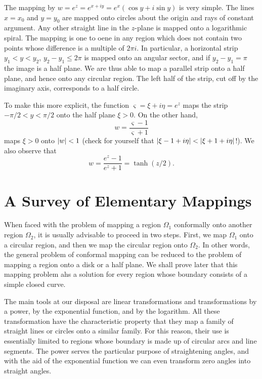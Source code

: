\begin{example}
    The mapping by $w=e^z=e^{x+iy}=e^x(\cos y+i \sin y)$ is very simple. The lines $x=x_0$ and $y=y_0$ are mapped onto circles about the origin and rays of constant argument. Any other straight line in the $z$-plane is mapped onto a logarithmic spiral. The mapping is one to oene in any region which does not contain two points whose difference is a multiple of $2\pi i$. In particular, a horizontal strip $y_1<y<y_2$, $y_2-y_1 \le 2\pi$ is mapped onto an angular sector, and if $y_2-y_1=\pi$ the image is a half plane. We are thus able to map a parallel strip onto a half plane, and hence onto any circular region. The left half of the strip, cut off by the imaginary axis, corresponds to a half circle.

    To make this more explicit, the function $\varsigma=\xi+i\eta=e^z$ maps the strip $-\pi/2<y<\pi/2$ onto the half plane $\xi>0$. On the other hand, $$w=\dfrac{\varsigma-1}{\varsigma+1}$$ maps $\xi>0$ onto $\lvert w \rvert<1$ (check for yourself that $\lvert \xi-1+i\eta \rvert<\lvert \xi+1+i\eta \rvert$!). We also observe that $$w=\dfrac{e^z-1}{e^z+1}=\tanh\left(z/2\right).$$
\end{example}

\section{A Survey of Elementary Mappings}
When faced with the problem of mapping a region $\Omega_1$ conformally onto another region $\Omega_2$, it is usually advisable to proceed in two steps. First, we map $\Omega_1$ onto a circular region, and then we map the circular region onto $\Omega_2$. In other words, the general problem of conformal mapping can be reduced to the problem of mapping a region onto a disk or a half plane. We shall prove later that this mapping problem ahs a solution for every region whose boundary consists of a simple closed curve.

The main tools at our disposal are linear transformations and transformations by a power, by the exponential function, and by the logarithm. All these transformation have the characteristic property that they map a family of straight lines or circles onto a similar family. For this reason, their use is essentially limited to regions whose boundary is made up of circular arcs and line segments. The power serves the particular purpose of straightening angles, and with the aid of the exponential function we can even transform zero angles into straight angles.

